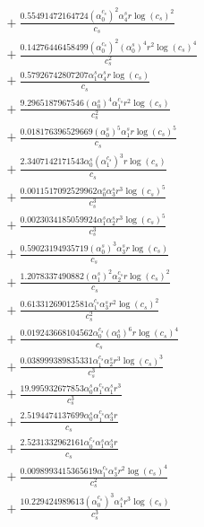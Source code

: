 \documentclass[10pt]{article}
\begin{document}
\begin{align*}
&{}  + \frac{0.55491472164724 \left(\alpha_{0}^{c_s}\right)^{2} \alpha_{4}^s r \log{\left(c_{s} \right)}^{2}}{c_{s}} \\
&{}  + \frac{0.14276446458499 \left(\alpha_{0}^{c_s}\right)^{2} \left(\alpha_{0}^s\right)^{4} r^{2} \log{\left(c_{s} \right)}^{4}}{c_{s}^{2}} \\
&{}  + \frac{0.57926742807207 \alpha_{1}^s \alpha_{4}^s r \log{\left(c_{s} \right)}}{c_{s}} \\
&{}  + \frac{9.2965187967546 \left(\alpha_{0}^s\right)^{4} \alpha_{1}^{c_s} r^{2} \log{\left(c_{s} \right)}}{c_{s}^{2}} \\
&{}  + \frac{0.018176396529669 \left(\alpha_{0}^s\right)^{5} \alpha_{1}^s r \log{\left(c_{s} \right)}^{5}}{c_{s}} \\
&{}  + \frac{2.3407142171543 \alpha_{0}^s \left(\alpha_{1}^{c_s}\right)^{3} r \log{\left(c_{s} \right)}}{c_{s}} \\
&{}  + \frac{0.0011517092529962 \alpha_{0}^s \alpha_{3}^s r^{3} \log{\left(c_{s} \right)}^{5}}{c_{s}^{3}} \\
&{}  + \frac{0.0023034185059924 \alpha_{1}^s \alpha_{2}^s r^{3} \log{\left(c_{s} \right)}^{5}}{c_{s}^{3}} \\
&{}  + \frac{0.59023194935719 \left(\alpha_{0}^s\right)^{3} \alpha_{3}^s r \log{\left(c_{s} \right)}}{c_{s}} \\
&{}  + \frac{1.2078337490882 \left(\alpha_{1}^s\right)^{2} \alpha_{2}^{c_s} r \log{\left(c_{s} \right)}^{2}}{c_{s}} \\
&{}  + \frac{0.61331269012581 \alpha_{1}^{c_s} \alpha_{3}^s r^{2} \log{\left(c_{s} \right)}^{2}}{c_{s}^{2}} \\
&{}  + \frac{0.019243668104562 \alpha_{0}^{c_s} \left(\alpha_{0}^s\right)^{6} r \log{\left(c_{s} \right)}^{4}}{c_{s}} \\
&{}  + \frac{0.038999389835331 \alpha_{1}^{c_s} \alpha_{2}^s r^{3} \log{\left(c_{s} \right)}^{3}}{c_{s}^{3}} \\
&{}  + \frac{19.995932677853 \alpha_{0}^s \alpha_{1}^{c_s} \alpha_{1}^s r^{3}}{c_{s}^{3}} \\
&{}  + \frac{2.5194474137699 \alpha_{0}^s \alpha_{1}^{c_s} \alpha_{3}^s r}{c_{s}} \\
&{}  + \frac{2.5231332962161 \alpha_{0}^{c_s} \alpha_{1}^s \alpha_{3}^s r}{c_{s}} \\
&{}  + \frac{0.0098993415365619 \alpha_{1}^{c_s} \alpha_{3}^s r^{2} \log{\left(c_{s} \right)}^{4}}{c_{s}^{2}} \\
&{}  + \frac{10.229424989613 \left(\alpha_{0}^{c_s}\right)^{3} \alpha_{1}^s r^{3} \log{\left(c_{s} \right)}}{c_{s}^{3}} \\

\end{align*}
\end{document}
